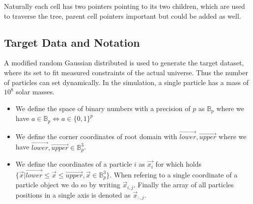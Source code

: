 \documentclass[]{article}
\begin{document}
Naturally each cell has two pointers pointing to its two children, which are used to traverse the tree, parent cell pointers important but could be added as well.


\subsection{Target Data and Notation}\label{sec:target-data}

\begin{comment}
The target data consists of $N$ particles where we use the following notations:

constrained realization
Gaussian random distribution, modified to match the measured power.

The higher the resolution the more accurate the result.

Large scales are more uniform, small scale 

smallest thing you want to be able to resolve. 

boxes around a giga parsec

want to be able to resolve galaxies, milky way 10^12 solar masses,

want to be able to resolve smaller galaxies, 10^8 for a single particle
Imp 
\end{comment}
A modified random Gaussian distributed is used to generate the target dataset, where its set to fit measured constraints of the actual universe. Thus the number of particles can set dynamically. In the simulation, a single particle has a mass of $10^8$ solar masses. 


\begin{itemize}
	\item We define the space of binary numbers with a precision of $p$ as $\mathbb{B}_p$ where we have $a \in \mathbb{B}_p \Leftrightarrow a \in \{0,1\}^{p}$
	\item We define the corner coordinates of root domain with $\vec{lower}, \vec{upper}$ where we have $\vec{lower}, \vec{upper} \in \mathbb{B}_p^3$. 
	\item We define the coordinates of a particle $i$ as $\vec{x_i}$ for which holds $\{\vec{x} | \vec{lower} \leq \vec{x} \leq \vec{upper}, \vec{x} \in \mathbb{B}_p^3 \}$.
	When refering to a single coordinate of a particle object we do so by writing $\vec{x}_{i,j}$. Finally the array of all particles positions in a single axis is denoted as $\vec{x}_{:,j}$. 
	
\end{itemize}
\end{document}
